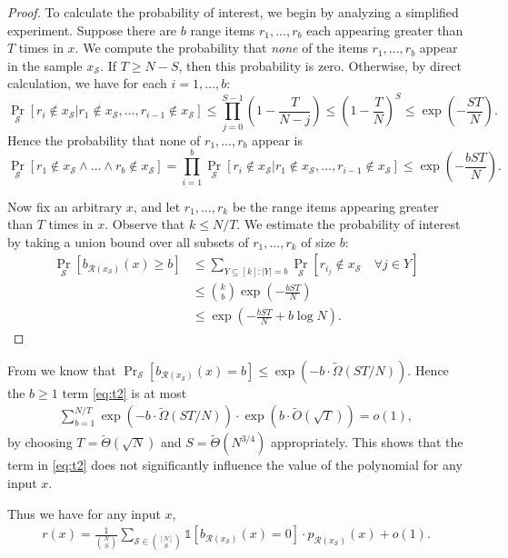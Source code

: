 \documentclass[11pt, letterpaper, fleqn]{article}
\theoremstyle{plain}
\newcommand{\tO}{\tilde{O}}
\newcommand{\tOmega}{\tilde{\Omega}}
\newcommand{\tTheta}{\tilde{\Theta}}
\newcommand{\id}{{\mathds{1}}}
\newcommand{\Rcal}{\mathcal{R}}
\newcommand{\Scal}{\mathcal{S}}
\begin{document}
\begin{proof}
To calculate the probability of interest, we begin by analyzing a simplified experiment. Suppose there are $b$ range items $r_1, \dots, r_b$ each appearing greater than $T$ times in $x$. We compute the probability that \emph{none} of the items $r_1, \dots, r_b$ appear in the sample $x_\Scal$. If $T \ge N - S$, then this probability is zero. Otherwise, by direct calculation, we have for each $i = 1, \dots, b$:
\[\Pr_{\Scal}[r_i \notin x_\Scal | r_1 \notin x_\Scal, \dots, r_{i-1} \notin x_\Scal] \le \prod_{j = 0}^{S-1} \left(1 - \frac{T}{N-j} \right) \le \left( 1 - \frac{T}{N}\right)^S \le \exp \left(-\frac{ST}{N} \right).\]
Hence the probability that none of $r_1, \dots, r_b$ appear is
\[\Pr_{\Scal}[r_1 \notin x_\Scal \land \dots \land r_b \notin x_\Scal] = \prod_{i  = 1}^b \Pr_{\Scal}[r_i \notin x_\Scal | r_1 \notin x_\Scal, \dots, r_{i-1} \notin x_\Scal] \le \exp \left(-\frac{bST}{N} \right).\]

Now fix an arbitrary $x$, and let $r_1, \dots, r_{k}$ be the range items appearing greater than $T$ times in $x$. Observe that $k \le N/T$. We estimate the probability of interest by taking a union bound over all subsets of $r_1, \dots, r_k$ of size $b$:
\begin{align*}
\Pr_{\Scal}[b_{\Rcal(x_\Scal)}(x) \ge b] &\le \sum_{Y \subseteq [k] : |Y| = b} \Pr_{\Scal}[r_{i_j} \notin x_\Scal \quad \forall j \in Y] \\
& \le \binom{k}{b} \exp \left(-\frac{bST}{N}\right) \\
&\le \exp \left( -\frac{bST}{N} + b \log N\right).
\end{align*}
\end{proof}


From  we know that $\Pr_{\Scal}[b_{\Rcal(x_\Scal)}(x)=b] \leq {\exp(-b \cdot \tOmega(ST/N))}$.
Hence the $b\geq1$ term \eqref{eq:t2} is at most
\begin{align}
    \sum_{b=1}^{N/T} {\exp(-b \cdot \tOmega(ST/N))} \cdot {\exp(b \cdot \tO(\sqrt{T}))} = o(1),
\end{align}
by choosing $T = \tTheta(\sqrt{N})$ and $S = \tTheta(N^{3/4})$ appropriately. This shows that the term in \eqref{eq:t2} does not significantly influence the value of the polynomial for any input $x$.

Thus we have for any input $x$,
\begin{align}
    r(x) = \frac{1}{\binom{N}{S}} \sum_{\Scal \in \binom{[N]}{S}} \id[b_{\Rcal(x_\Scal)}(x)=0]  \cdot p_{\Rcal(x_\Scal)}(x) + o(1).
\end{align}
\end{document}
